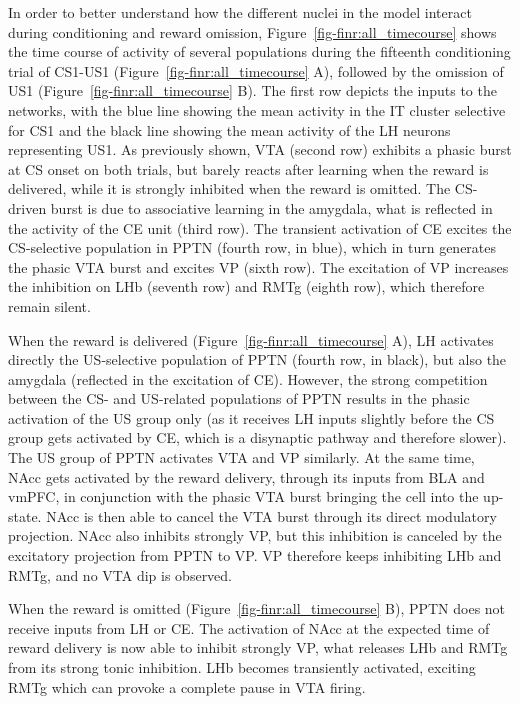 \documentclass[
  11pt,
  a4paper,
]{scrbook}
\begin{document}
In order to better understand how the different nuclei in the model
interact during conditioning and reward omission,
Figure~\ref{fig-finr:all_timecourse} shows the time course of activity
of several populations during the fifteenth conditioning trial of
CS1-US1 (Figure~\ref{fig-finr:all_timecourse} A), followed by the
omission of US1 (Figure~\ref{fig-finr:all_timecourse} B). The first row
depicts the inputs to the networks, with the blue line showing the mean
activity in the IT cluster selective for CS1 and the black line showing
the mean activity of the LH neurons representing US1. As previously
shown, VTA (second row) exhibits a phasic burst at CS onset on both
trials, but barely reacts after learning when the reward is delivered,
while it is strongly inhibited when the reward is omitted. The CS-driven
burst is due to associative learning in the amygdala, what is reflected
in the activity of the CE unit (third row). The transient activation of
CE excites the CS-selective population in PPTN (fourth row, in blue),
which in turn generates the phasic VTA burst and excites VP (sixth row).
The excitation of VP increases the inhibition on LHb (seventh row) and
RMTg (eighth row), which therefore remain silent.

When the reward is delivered (Figure~\ref{fig-finr:all_timecourse} A),
LH activates directly the US-selective population of PPTN (fourth row,
in black), but also the amygdala (reflected in the excitation of CE).
However, the strong competition between the CS- and US-related
populations of PPTN results in the phasic activation of the US group
only (as it receives LH inputs slightly before the CS group gets
activated by CE, which is a disynaptic pathway and therefore slower).
The US group of PPTN activates VTA and VP similarly. At the same time,
NAcc gets activated by the reward delivery, through its inputs from BLA
and vmPFC, in conjunction with the phasic VTA burst bringing the cell
into the up-state. NAcc is then able to cancel the VTA burst through its
direct modulatory projection. NAcc also inhibits strongly VP, but this
inhibition is canceled by the excitatory projection from PPTN to VP. VP
therefore keeps inhibiting LHb and RMTg, and no VTA dip is observed.

When the reward is omitted (Figure~\ref{fig-finr:all_timecourse} B),
PPTN does not receive inputs from LH or CE. The activation of NAcc at
the expected time of reward delivery is now able to inhibit strongly VP,
what releases LHb and RMTg from its strong tonic inhibition. LHb becomes
transiently activated, exciting RMTg which can provoke a complete pause
in VTA firing.
\end{document}
